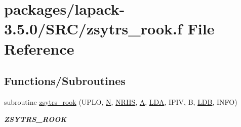 \hypertarget{zsytrs__rook_8f}{}\section{packages/lapack-\/3.5.0/\+S\+R\+C/zsytrs\+\_\+rook.f File Reference}
\label{zsytrs__rook_8f}
\subsection*{Functions/\+Subroutines}
\begin{DoxyCompactItemize}
\item 
subroutine \hyperlink{group__complex16SYcomputational_ga6dde92f23ca51a2fec21da88a55703cd}{zsytrs\+\_\+rook} (U\+P\+L\+O, \hyperlink{polmisc_8c_a0240ac851181b84ac374872dc5434ee4}{N}, \hyperlink{example__user_8c_aa0138da002ce2a90360df2f521eb3198}{N\+R\+H\+S}, \hyperlink{classA}{A}, \hyperlink{example__user_8c_ae946da542ce0db94dced19b2ecefd1aa}{L\+D\+A}, I\+P\+I\+V, B, \hyperlink{example__user_8c_a50e90a7104df172b5a89a06c47fcca04}{L\+D\+B}, I\+N\+F\+O)
\begin{DoxyCompactList}\small\item\em {\bfseries Z\+S\+Y\+T\+R\+S\+\_\+\+R\+O\+O\+K} \end{DoxyCompactList}\end{DoxyCompactItemize}
